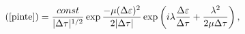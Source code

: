 \begin{equation}
(\ref{pinte})=\frac{const}{|\Delta\tau|^{1/2}} \exp {\frac{-\mu(\Delta\varepsilon)^2 }{2|
\Delta\tau|}}\exp\left( i\lambda \frac{\Delta\varepsilon}{\Delta\tau}+\frac{\lambda^2}{2\mu\Delta\tau}\right),
\end{equation}

